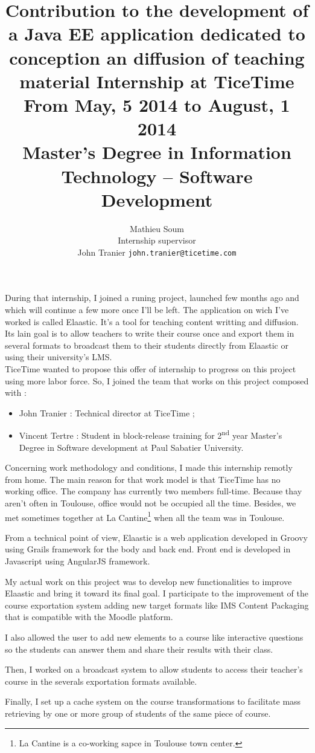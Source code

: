 \documentclass[a4paper, 11pt]{article}
\title{
  Contribution to the development of a Java EE application dedicated to
  conception an diffusion of teaching material
  \vspace{10px}
  {
	\large Internship at TiceTime\\
	From May, 5\ts{th} 2014 to August, 1\ts{st} 2014\\
	Master's Degree in Information Technology -- Software Development
  }
}
\author{
  Mathieu {\sc Soum}
  \vspace{10px}\\
  Internship supervisor\\
	John {\sc Tranier} {\tt john.tranier@ticetime.com}
}
\date{}
\newcommand{\ts}{\textsuperscript}
\begin{document}
\maketitle

During that internship, I joined a runing project, launched few months ago and
which will continue a few more once I'll be left. The application on wich I've
worked is called Elaastic. It's a tool for teaching content writting and
diffusion. Its lain goal is to allow teachers to write their course once and
export them in several formats to broadcast them to their students directly from
Elaastic or using their university's LMS.\\

TiceTime wanted to propose this offer of internship to progress on this project
using more labor force. So, I joined the team that works on this project
composed with :
\begin{itemize}
  \item John {\sc Tranier} : Technical director at TiceTime ;
  \item Vincent {\sc Tertre} : Student in block-release training for 2\ts{nd}
	year Master's Degree in Software development at Paul Sabatier University.
\end{itemize}
\vspace{10px}

Concerning work methodology and conditions, I made this internship remotly from
home. The main reason for that work model is that TiceTime has no working
office. The company has currently two members full-time. Because thay aren't
often in Toulouse, office would not be occupied all the time. Besides, we met
sometimes together at La Cantine\footnote{La Cantine is a co-working sapce in
Toulouse town center.} when all the team was in Toulouse.

From a technical point of view, Elaastic is a web application developed in
Groovy using Grails framework for the body and back end. Front end is developed
in Javascript using AngularJS framework.

My actual work on this project was to develop new functionalities to improve
Elaastic and bring it toward its final goal. I participate to the improvement of
the course exportation system adding new target formats like IMS Content
Packaging that is compatible with the Moodle platform.

I also allowed the user
to add new elements to a course like interactive questions so the students can
answer them and share their results with their class.

Then, I worked on a
broadcast system to allow students to access their teacher's course in the
severals exportation formats available.

Finally, I set up a cache system on the
course transformations to facilitate mass retrieving by one or more group of
students of the same piece of course.
\end{document}
